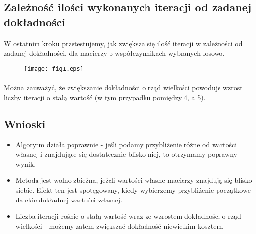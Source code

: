 \documentclass{article}
\begin{document}
\subsection{Zależność ilości wykonanych iteracji od zadanej dokładności}
\paragraph{}
W ostatnim kroku przetestujemy, jak zwiększa się ilość iteracji w zależności od zadanej dokładności, dla macierzy o współczynnikach wybranych losowo.
\begin{figure}[H]
  \texttt{[image: fig1.eps]}
\end{figure}
\paragraph{}
Można zauważyć, że zwiększanie dokładności o rząd wielkości powoduje wzrost liczby iteracji o stałą wartość (w tym przypadku pomiędzy 4, a 5).
\subsection{Wnioski}
\begin{itemize}
\item Algorytm działa poprawnie - jeśli podamy przybliżenie różne od wartości własnej i znajdujące się dostatecznie blisko niej, to otrzymamy poprawny wynik.
\item Metoda jest wolno zbieżna, jeżeli wartości własne macierzy znajdują się blisko siebie. Efekt ten jest spotęgowany, kiedy wybierzemy przybliżenie początkowe dalekie dokładnej wartości własnej.
\item Liczba iteracji rośnie o stałą wartość wraz ze wzrostem dokładności o rząd wielkości - możemy zatem zwiększać dokładność niewielkim kosztem.
\end{itemize}
\end{document}

